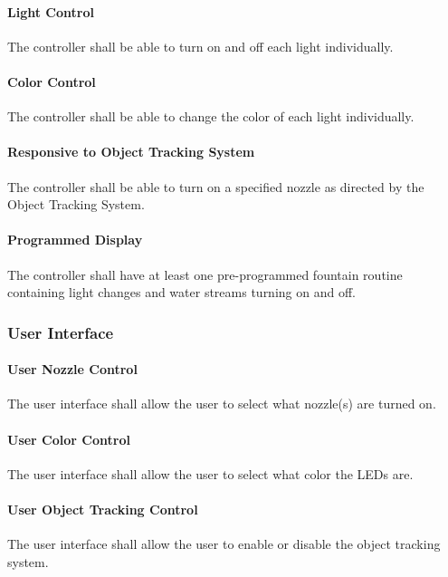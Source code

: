 \paragraph{Light Control}
The controller shall be able to turn on and off each light individually.

\paragraph{Color Control}
The controller shall be able to change the color of each light individually.

\paragraph{Responsive to Object Tracking System} 
The controller shall be able to turn on a specified nozzle as directed by the Object Tracking System.

\paragraph{Programmed Display}
The controller shall have at least one pre-programmed fountain routine containing light changes and water streams turning on and off.

\subsubsection{User Interface}

\paragraph{User Nozzle Control}
The user interface shall allow the user to select what nozzle(s) are turned on.

\paragraph{User Color Control}
The user interface shall allow the user to select what color the LEDs are.

\paragraph{User Object Tracking Control}
The user interface shall allow the user to enable or disable the object tracking system.

